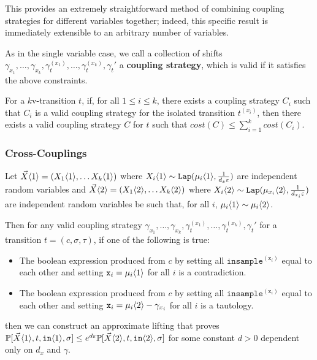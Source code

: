 This provides an extremely straightforward method of combining coupling strategies for different variables together; indeed, this specific result is immediately extensible to an arbitrary number of variables. 

As in the single variable case, we call a collection of shifts $\gamma_{x_1}, \ldots, \gamma_{x_k}, \gamma_t^{(x_1)}, \ldots, \gamma_t^{(x_k)}, \gamma_t'$ a \textbf{coupling strategy}, which is valid if it satisfies the above constraints. 

\begin{cor}
    For a $k$v-transition $t$, if, for all $1\leq i\leq k$, there exists a coupling strategy $C_i$ such that $C_i$ is a valid coupling strategy for the isolated transition $t^{(x_i)}$, then there exists a valid coupling strategy $C$ for $t$ such that $cost(C)\leq \sum_{i=1}^k cost(C_i)$.
\end{cor}


\subsubsection{Cross-Couplings}

\begin{lemma}\label{mvCrossCoupling}
    Let $\vec{X}\langle1 \rangle = (X_1\langle1 \rangle, \ldots X_k\langle1 \rangle)$ where $X_i\langle1 \rangle\sim \texttt{Lap}(\mu_i\langle1 \rangle, \frac{1}{d_x\varepsilon})$ are independent random variables and $\vec{X}\langle2 \rangle = (X_1\langle2 \rangle, \ldots X_k\langle2 \rangle)$ where $X_i\langle2 \rangle\sim \texttt{Lap}(\mu_{x_i}\langle2 \rangle, \frac{1}{d_{x_i}\varepsilon})$ are independent random variables be such that, for all $i$, $\mu_i\langle1 \rangle\sim \mu_i\langle2 \rangle$.

    Then for any valid coupling strategy $\gamma_{x_1}, \ldots, \gamma_{x_k}, \gamma_t^{(x_1)}, \ldots, \gamma_t^{(x_k)}, \gamma_t'$ for a transition $t = (c, \sigma,\tau)$, if one of the following is true: \begin{itemize}
        \item The boolean expression produced from $c$ by setting all $\texttt{insample}^{(\texttt{x}_i)}$ equal to each other and setting $\texttt{x}_i = \mu_i\langle1 \rangle$ for all $i$ is a contradiction.
        \item The boolean expression produced from $c$ by setting all $\texttt{insample}^{(\texttt{x}_i)}$ equal to each other and setting $\texttt{x}_i = \mu_i\langle2 \rangle-\gamma_{x_i}$ for all $i$ is a tautology.
    \end{itemize}
    then we can construct an approximate lifting that proves $\mathbb{P}[\vec{X}\langle1 \rangle, t, \texttt{in}\langle1 \rangle, \sigma]\leq e^{d\varepsilon}\mathbb{P}[\vec{X}\langle2 \rangle, t, \texttt{in}\langle2 \rangle, \sigma]$ for some constant $d>0$ dependent only on $d_x$ and $\gamma$. 
\end{lemma}

